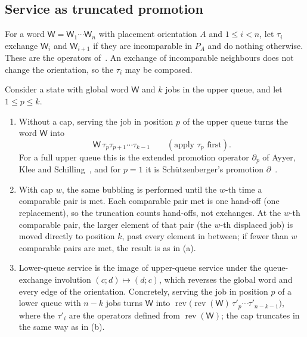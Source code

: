 \documentclass[11pt,a4paper]{article}
\theoremstyle{plain}
\theoremstyle{plain}
\newcommand{\rev}{\operatorname{rev}}
\newcommand{\W}{\mathsf{W}}
\begin{document}
\subsection{Service as truncated promotion}

For a word $\W=\W_1\cdots\W_n$ with placement orientation $A$ and $1\le i<n$, let $\tau_i$ exchange $\W_i$ and $\W_{i+1}$ if they are incomparable in $P_A$ and do nothing otherwise. These are the operators of~\cite[Section~2]{AKS2014}. An exchange of incomparable neighbours does not change the orientation, so the $\tau_i$ may be composed.

\begin{proposition}\label{prop:promotion}
Consider a state with global word $\W$ and $k$ jobs in the upper queue, and let $1\le p\le k$.
\begin{enumerate}[label=(\alph*)]
\item Without a cap, serving the job in position $p$ of the upper queue turns the word $\W$ into
\[\W\,\tau_p\tau_{p+1}\cdots\tau_{k-1}\qquad(\text{apply }\tau_p\text{ first}).\] For a full upper queue this is the extended promotion operator $\partial_p$ of Ayyer, Klee and Schilling~\cite{AKS2014}, and for $p=1$ it is Sch\"utzenberger's promotion $\partial$~\cite{Sch1972,Sta2009}.
\item With cap $w$, the same bubbling is performed until the $w$-th time a comparable pair is met. Each comparable pair met is one hand-off (one replacement), so the truncation counts hand-offs, not exchanges. At the $w$-th comparable pair, the larger element of that pair (the $w$-th displaced job) is moved directly to position $k$, past every element in between; if fewer than $w$ comparable pairs are met, the result is as in (a).
\item Lower-queue service is the image of upper-queue service under the queue-exchange involution $(c;d)\mapsto(d;c)$, which reverses the global word and every edge of the orientation. Concretely, serving the job in position $p$ of a lower queue with $n-k$ jobs turns $\W$ into $\rev\bigl(\rev(\W)\,\tau'_p\cdots\tau'_{n-k-1}\bigr)$, where the $\tau'_i$ are the operators defined from $\rev(\W)$; the cap truncates in the same way as in (b).
\end{enumerate}
\end{proposition}
\end{document}
